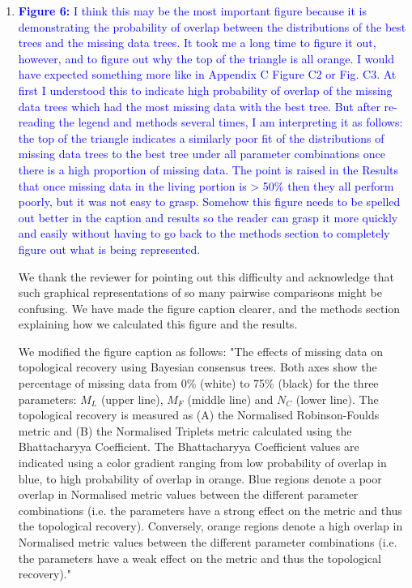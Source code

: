 \documentclass[12pt,letterpaper]{article}
\begin{document}
\begin{enumerate}
\item{\textcolor{blue}{\textbf{Figure 6:} I think this may be the most important figure because it is demonstrating the probability of overlap between the distributions of the best trees and the missing data trees.
It took me a long time to figure it out, however, and to figure out why the top of the triangle is all orange.
I would have expected something more like in Appendix C Figure C2 or Fig. C3.
At first I understood this to indicate high probability of overlap of the missing data trees which had the most missing data with the best tree.
But after re-reading the legend and methods several times, I am interpreting it as follows: the top of the triangle indicates a similarly poor fit of the distributions of missing data trees to the best tree under all parameter combinations once there is a high proportion of missing data.
The point is raised in the Results that once missing data in the living portion is > 50\% then they all perform poorly, but it was not easy to grasp.
Somehow this figure needs to be spelled out better in the caption and results so the reader can grasp it more quickly and easily without having to go back to the methods section to completely figure out what is being represented.}}

We thank the reviewer for pointing out this difficulty and acknowledge that such graphical representations of so many pairwise comparisons might be confusing.
We have made the figure caption clearer, and the methods section explaining how we calculated this figure and the results.

We modified the figure caption as follows:
"The effects of missing data on topological recovery using Bayesian consensus trees. Both axes show the percentage of missing data from 0\% (white) to 75\% (black) for the three parameters: $M_{L}$ (upper line), $M_{F}$ (middle line) and $N_{C}$ (lower line). The topological recovery is measured as (A) the Normalised Robinson-Foulds metric and (B) the Normalised Triplets metric calculated using the Bhattacharyya Coefficient. The Bhattacharyya Coefficient values are indicated using a color gradient ranging from low probability of overlap in blue, to high probability of overlap in orange. Blue regions denote a poor overlap in Normalised metric values between the different parameter combinations (i.e. the parameters have a strong effect on the metric and thus the topological recovery). Conversely, orange regions denote a high overlap in Normalised metric values between the different parameter combinations (i.e. the parameters have a weak effect on the metric and thus the topological recovery)." 


\end{enumerate}
\end{document}
